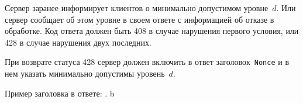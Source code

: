 Сервер заранее информирует клиентов о минимально допустимом уровне~$d$.
Или сервер сообщает об этом уровне в своем ответе с информацией об отказе 
в обработке. Код ответа должен быть 408 в случае нарушения первого 
условия, или 428 в случае нарушения двух последних.

При возврате статуса 428 сервер должен включить в ответ 
заголовок~\texttt{Nonce} и в нем указать минимально допустимы 
уровень~$d$.

Пример заголовка в ответе: .
b 








